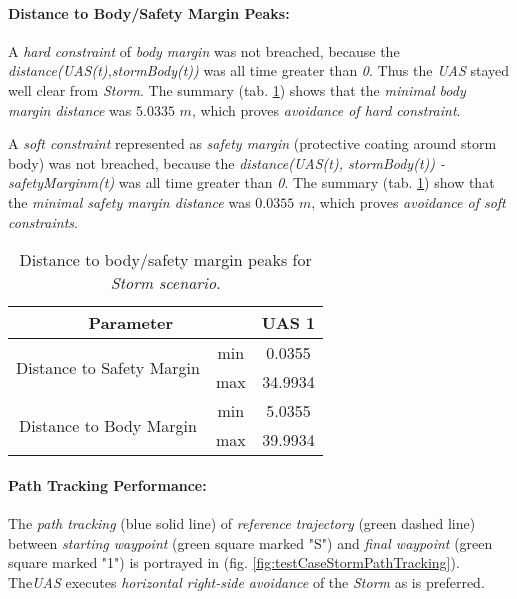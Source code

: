     
    \paragraph{Distance to Body/Safety Margin Peaks:} A \emph{hard constraint} of \emph{body margin} was not breached, because the \emph{distance(UAS(t),stormBody(t))} was all time greater than \emph{0}. Thus the \emph{UAS} stayed well clear from \emph{Storm}. The summary (tab. \ref{tab:testCaseStormSafetyAndBodyMarginDistances}) shows that the \emph{minimal body margin distance} was $5.0335$ $m$, which proves \emph{avoidance of hard constraint}.
    
    A \emph{soft constraint} represented as \emph{safety margin} (protective coating around storm body) was not breached, because the \emph{distance(UAS(t), stormBody(t)) - safetyMarginm(t)} was all time greater than \emph{0}.  The summary (tab. \ref{tab:testCaseStormSafetyAndBodyMarginDistances}) show that the \emph{minimal safety margin distance} was $0.0355$ $m$, which proves \emph{avoidance of soft constraints}.
    
    \begin{table}[H]
        \centering
        \begin{tabular}{c|c||c}
        \multicolumn{2}{c||}{Parameter} & UAS 1 \\\hline\hline
        \multirow{2}{*}{Distance to Safety Margin} & min & 0.0355 \\\cline{2-3}
                                                & max & 34.9934 \\\hline
        \multirow{2}{*}{Distance to Body Margin}   & min & 5.0355 \\\cline{2-3}
                                                & max & 39.9934 
        \end{tabular}
        \caption{Distance to body/safety margin peaks for \emph{Storm scenario}.}
        \label{tab:testCaseStormSafetyAndBodyMarginDistances}
    \end{table}
    
    \paragraph{Path Tracking Performance:} The \emph{path tracking} (blue solid line) of \emph{reference trajectory} (green dashed line) between \emph{starting waypoint} (green square marked "S") and \emph{final waypoint} (green square marked "1") is portrayed in (fig. \ref{fig:testCaseStormPathTracking}). The\emph{UAS} executes \emph{horizontal right-side avoidance} of the \emph{Storm} as is preferred. 
    
